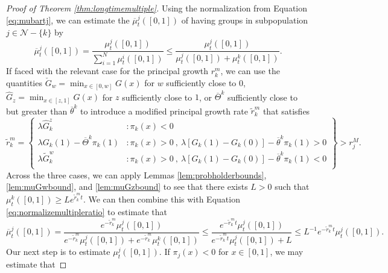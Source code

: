 \documentclass[11pt]{article}
\numberwithin{equation}{section}
\newcommand{\ol}{\overline}
\begin{document}
{ 
\begin{proof}[Proof of Theorem \ref{thm:longtimemultiple}]
 Using the normalization from Equation \eqref{eq:mubartj}, we can estimate the $\ol{\mu}_t^j\left([0,1]\right)$ of having groups in subpopulation $j \in \mathcal{N} - \{k\}$ by
 \begin{equation} \label{eq:normalizemultipleratio}
     \ol{\mu}_t^j\left([0,1]\right) =  \frac{\mu_t^j\left([0,1]\right) } {\sum_{i=1}^N \mu_t^i\left([0,1]\right)} \leq \frac{\mu_t^j\left([0,1]\right)}{\mu_t^j\left([0,1]\right) + \mu_t^k\left([0,1]\right)}.
 \end{equation} 
If faced with the relevant case for the principal growth $r_k^m$, we can use the quantities $\check{G}_w = \min_{x\in[0,w]}G(x)$ for $w$ sufficiently close to $0$,  $\hat{G}_z = \min_{x \in [z,1]} G(x)$  for $z$ sufficiently close to $1$, or $\overline{\Theta}^k$ sufficiently close to but greater than $\overline{\theta}^k$ to introduce a modified principal growth rate $\tilde{r}_k^m$ that satisfies 
 \begin{equation}
\tilde{r}_k^m  = \left\{
     \begin{array}{cl}
       \lambda \hat{G}_k^z & : \pi_k(x) < 0\\
       \lambda G_k(1) - \overline{\Theta}^k \pi_k(1) & : \pi_k(x) > 0\: , \: \lambda \left[ G_k(1) - G_k(0) \right] - \overline{\theta}^k \pi_k(1) > 0 \\ 
       \lambda \tilde{G}_k^w & : \pi_k(x) > 0 \: , \: \lambda \left[ G_k(1) - G_k(0) \right] - \overline{\theta}^k \pi_k(1) < 0 \\ 
     \end{array}    \right\} > r_j^M.
\end{equation}
Across the three cases, we can apply Lemmas \ref{lem:probholderbounds}, \ref{lem:muGwbound}, and \ref{lem:muGzbound} to see that there exists $L > 0$ such that $\mu^k_t\left( \left[0,1\right]\right) \geq L e^{\tilde{r}_k^m t}$. We can then combine this with Equation \eqref{eq:normalizemultipleratio} to estimate that
\begin{equation} \label{eq:multipledenominatorunfixed}
\ol{\mu}_t^j\left([0,1]\right) = \frac{e^{-\tilde{r}_k^m}\mu_t^j\left([0,1]\right)}{e^{-\tilde{r}_k^m}\mu_t^j\left([0,1]\right) + e^{-\tilde{r}_k^m}\mu_t^k\left([0,1]\right)} \leq \frac{e^{-\tilde{r}_k^m t}\mu_t^j\left([0,1]\right)}{e^{-\tilde{r}_k^m t}\mu_t^j\left([0,1]\right) + L} \leq L^{-1} e^{-\tilde{r}_k^m t}\mu_t^j\left([0,1]\right). \end{equation}
Our next step is to estimate $\mu_t^j\left([0,1]\right)$. If $\pi_j(x) < 0$ for $x \in [0,1]$, we may estimate that

\end{proof}}
\end{document}
